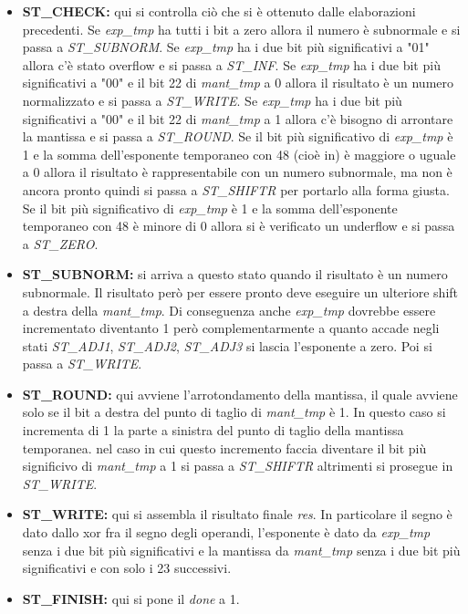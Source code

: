 \documentclass[]{IEEEtran}
\begin{document}
\begin{itemize}
    \item \textbf{ST\_CHECK:} qui si controlla ciò che si è ottenuto dalle elaborazioni precedenti. Se \textit{exp\_tmp} ha tutti i bit a zero allora il numero è subnormale e si passa a \textit{ST\_SUBNORM}. Se \textit{exp\_tmp} ha i due bit più significativi a "01" allora c'è stato overflow e si passa a \textit{ST\_INF}. Se \textit{exp\_tmp} ha i due bit più significativi a "00" e il bit 22 di \textit{mant\_tmp} a 0 allora il risultato è un numero normalizzato e si passa a \textit{ST\_WRITE}. Se \textit{exp\_tmp} ha i due bit più significativi a "00" e il bit 22 di \textit{mant\_tmp} a 1 allora c'è bisogno di arrontare la mantissa e si passa a \textit{ST\_ROUND}. Se il bit più significativo di \textit{exp\_tmp} è 1 e la somma dell'esponente temporaneo con 48 (cioè in) è maggiore o uguale a 0 allora il risultato è rappresentabile con un numero subnormale, ma non è ancora pronto quindi si passa a \textit{ST\_SHIFTR} per portarlo alla forma giusta. Se il bit più significativo di \textit{exp\_tmp} è 1 e la somma dell'esponente temporaneo con 48 è minore di 0 allora si è verificato un underflow e si passa a \textit{ST\_ZERO}.
    \item \textbf{ST\_SUBNORM:} si arriva a questo stato quando il risultato è un numero subnormale. Il risultato però per essere pronto deve eseguire un ulteriore shift a destra della \textit{mant\_tmp}. Di conseguenza anche \textit{exp\_tmp} dovrebbe essere incrementato diventanto 1 però complementarmente a quanto accade negli stati \textit{ST\_ADJ1}, \textit{ST\_ADJ2}, \textit{ST\_ADJ3} si lascia l'esponente a zero. Poi si passa a \textit{ST\_WRITE}.
    \item \textbf{ST\_ROUND:} qui avviene l'arrotondamento della mantissa, il quale avviene solo se il bit a destra del punto di taglio di \textit{mant\_tmp} è 1. In questo caso si incrementa di 1 la parte a sinistra del punto di taglio della mantissa temporanea. nel caso in cui questo incremento faccia diventare il bit più significivo di \textit{mant\_tmp} a 1 si passa a \textit{ST\_SHIFTR} altrimenti si prosegue in \textit{ST\_WRITE}.
    \item \textbf{ST\_WRITE:} qui si assembla il risultato finale \textit{res}. In particolare il segno è dato dallo xor fra il segno degli operandi, l'esponente è dato da \textit{exp\_tmp} senza i due bit più significativi e la mantissa da \textit{mant\_tmp} senza i due bit più significativi e con solo i 23 successivi.
    \item \textbf{ST\_FINISH:} qui si pone il \textit{done} a 1.
\end{itemize}
\end{document}
